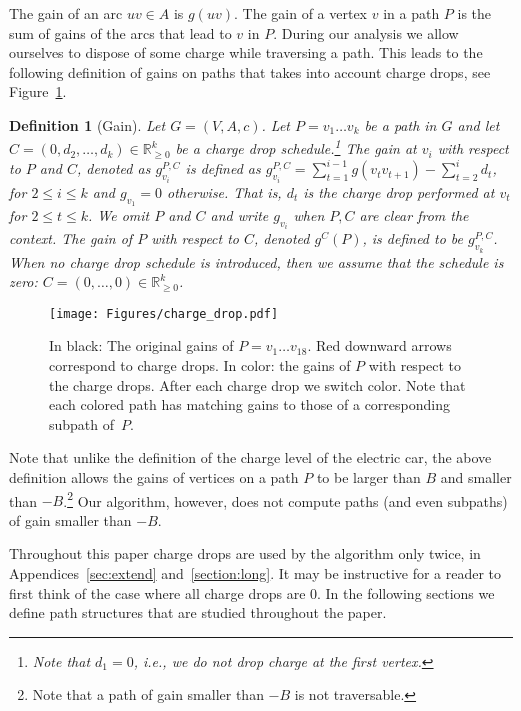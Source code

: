 \documentclass[11pt]{article}
\newtheorem{definition}[theorem]{Definition}
\newcommand{\RR}{\mathbb{R}}
\begin{document}
The gain of an arc $uv\in A$ is $g(uv)$. The gain of a vertex $v$ in a path $P$ is the sum of gains of the arcs  that lead to $v$ in $P$. During our analysis we allow ourselves to dispose of some charge while traversing a path. This leads to the following definition of gains on paths that takes into account charge drops, see Figure~\ref{fig:example_charge_drop}.

\begin{definition}[Gain]\label{def:gain}
    Let $G=(V,A,c)$. Let $P=v_1\ldots v_k$ be a path in $G$ and let $C=(0,d_2,\ldots, d_k)\in \RR^k_{\ge 0}$   be a charge drop schedule.\footnote{Note that $d_1=0$, i.e., we do not drop charge at the first vertex.} The \emph{gain} at $v_i$ with respect to $P$ and $C$, denoted as $g^{P,C}_{v_i}$ is defined as $g_{v_i}^{P,C} =\sum_{t=1}^{i-1} g(v_{t} v_{t+1}) - \sum_{t=2}^{i} d_t$, for $2\le i\le k$ and $g_{v_1} = 0$ otherwise. That is, $d_t$ is the charge drop performed at $v_t$ for $2\le t \le k$. 
    We omit $P$ and $C$ and write $g_{v_i}$ when $P,C$ are clear from the context. The gain of $P$ with respect to $C$, denoted $g^C(P)$, is defined to be $g^{P,C}_{v_k}$. When no charge drop schedule is introduced, then we assume that the schedule is zero: $C = (0,\ldots,0) \in \RR^k_{\ge 0}$. 
\end{definition}


\begin{figure}[t]
    \centering
    \texttt{[image: Figures/charge\_drop.pdf]}
    \caption{
    In black: The original gains of $P=v_1\ldots v_{18}$. Red downward arrows correspond to charge drops. In color: the gains of $P$ with respect to the charge drops. After each charge drop we switch color. Note that each colored path has matching gains to those of a corresponding subpath of~$P$.}
    \label{fig:example_charge_drop}
\end{figure}

Note that unlike the definition of the charge level of the electric car, the above definition allows the gains of vertices on a path $P$ to be larger than $B$ and smaller than $-B$.\footnote{Note that a path of gain smaller than $-B$ is not traversable.} 
Our algorithm, however, does not 
compute paths (and even subpaths) of gain smaller than $-B$.


Throughout this paper charge drops are used by the algorithm only twice, in Appendices~\ref{sec:extend} and~\ref{section:long}. 
It may be instructive for a reader to first think of 
the case where all charge drops are $0$. In the following sections we define path structures that are studied throughout the paper.
\end{document}
